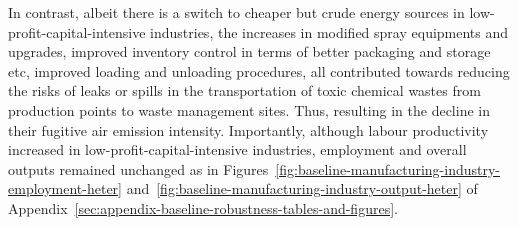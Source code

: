 \documentclass{C:/Users/david/OneDrive/Documents/ULMS/PhD/Thesis/chapter3/src/climate_change/latex/Economic_Journal/OUP-EJ}
\begin{document}
    In contrast, albeit there is a switch to cheaper but crude energy sources in low-profit-capital-intensive industries, the increases in modified spray equipments and upgrades, improved inventory control in terms of better packaging and storage etc, improved loading and unloading procedures, all contributed towards reducing the risks of leaks or spills in the transportation of toxic chemical wastes from production points to waste management sites. Thus, resulting in the decline in their fugitive air emission intensity. Importantly, although labour productivity increased in low-profit-capital-intensive industries, employment and overall outputs remained unchanged as in Figures~\ref{fig:baseline-manufacturing-industry-employment-heter} and~\ref{fig:baseline-manufacturing-industry-output-heter} of Appendix~\ref{sec:appendix-baseline-robustness-tables-and-figures}.
\end{document}
